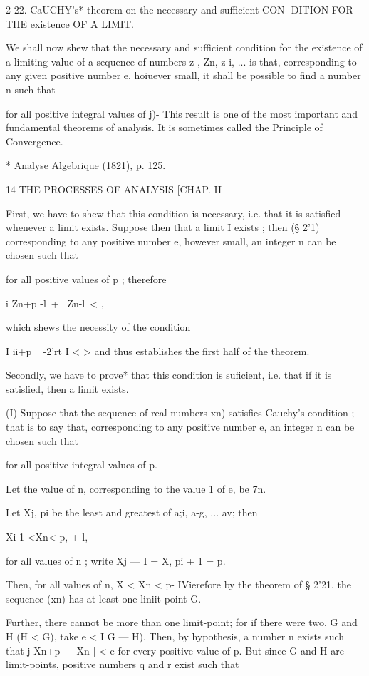 2-22. CaUCHY's* theorem on the necessary and sufficient CON- 
DITION FOR THE existence OF A LIMIT. 

We shall now shew that the necessary and sufficient condition for the 
existence of a limiting value of a sequence of numbers z , Zn, z-i, ... is that, 
corresponding to any given positive number e, hoiuever small, it shall be 
possible to find a number n such that 

for all positive integral values of j)- This result is one of the most important 
and fundamental theorems of analysis. It is sometimes called the Principle 
of Convergence. 

* Analyse Algebrique (1821), p. 125. 



14 THE PROCESSES OF ANALYSIS [CHAP. II 

First, we have to shew that this condition is necessary, i.e. that it is 
satisfied whenever a limit exists. Suppose then that a limit I exists ; then 
(§ 2'1) corresponding to any positive number e, however small, an integer n 
can be chosen such that 

for all positive values of p ; therefore 

  i Zn+p -l\ + \ Zn-l\ <  , 

which shews the necessity of the condition 

I  ii+p ~ -2'rt I <  > 
and thus establishes the first half of the theorem. 

Secondly, we have to prove* that this condition is suficient, i.e. that if 
it is satisfied, then a limit exists. 

(I) Suppose that the sequence of real numbers  xn) satisfies Cauchy's 
condition ; that is to say that, corresponding to any positive number e, an 
integer n can be chosen such that 

for all positive integral values of p. 

Let the value of n, corresponding to the value 1 of e, be 7n. 

Let Xj, pi be the least and greatest of a;i, a-g, ... av; then 

Xi-1 <Xn< p, + l, 

for all values of n ; write Xj — I = X, pi + 1 = p. 

Then, for all values of n, X < Xn < p- IVierefore by the theorem of § 2'21, 
the sequence (xn) has at least one liniit-point G. 

Further, there cannot be more than one limit-point; for if there were 
two, G and H (H < G), take e < I  G — H). Then, by hypothesis, a number 
n exists such that j Xn+p — Xn | < e for every positive value of p. But since G 
and H are limit-points, positive numbers q and r exist such that 

